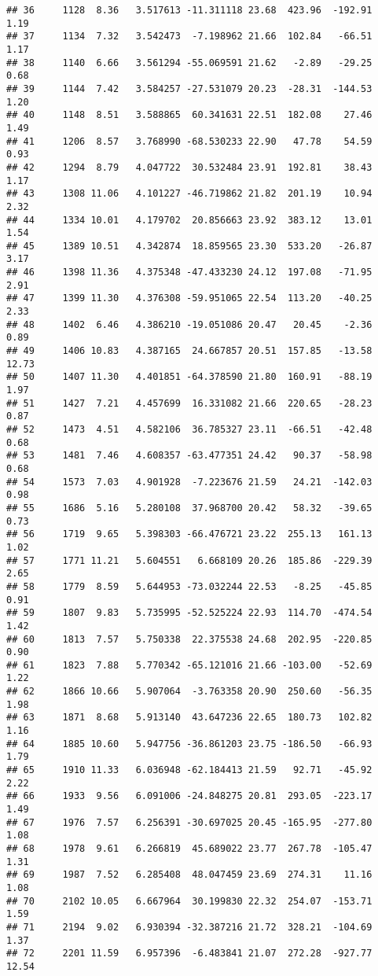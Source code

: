 \documentclass[]{article}
\begin{document}
\begin{verbatim}
## 36     1128  8.36   3.517613 -11.311118 23.68  423.96  -192.91  1.19
## 37     1134  7.32   3.542473  -7.198962 21.66  102.84   -66.51  1.17
## 38     1140  6.66   3.561294 -55.069591 21.62   -2.89   -29.25  0.68
## 39     1144  7.42   3.584257 -27.531079 20.23  -28.31  -144.53  1.20
## 40     1148  8.51   3.588865  60.341631 22.51  182.08    27.46  1.49
## 41     1206  8.57   3.768990 -68.530233 22.90   47.78    54.59  0.93
## 42     1294  8.79   4.047722  30.532484 23.91  192.81    38.43  1.17
## 43     1308 11.06   4.101227 -46.719862 21.82  201.19    10.94  2.32
## 44     1334 10.01   4.179702  20.856663 23.92  383.12    13.01  1.54
## 45     1389 10.51   4.342874  18.859565 23.30  533.20   -26.87  3.17
## 46     1398 11.36   4.375348 -47.433230 24.12  197.08   -71.95  2.91
## 47     1399 11.30   4.376308 -59.951065 22.54  113.20   -40.25  2.33
## 48     1402  6.46   4.386210 -19.051086 20.47   20.45    -2.36  0.89
## 49     1406 10.83   4.387165  24.667857 20.51  157.85   -13.58 12.73
## 50     1407 11.30   4.401851 -64.378590 21.80  160.91   -88.19  1.97
## 51     1427  7.21   4.457699  16.331082 21.66  220.65   -28.23  0.87
## 52     1473  4.51   4.582106  36.785327 23.11  -66.51   -42.48  0.68
## 53     1481  7.46   4.608357 -63.477351 24.42   90.37   -58.98  0.68
## 54     1573  7.03   4.901928  -7.223676 21.59   24.21  -142.03  0.98
## 55     1686  5.16   5.280108  37.968700 20.42   58.32   -39.65  0.73
## 56     1719  9.65   5.398303 -66.476721 23.22  255.13   161.13  1.02
## 57     1771 11.21   5.604551   6.668109 20.26  185.86  -229.39  2.65
## 58     1779  8.59   5.644953 -73.032244 22.53   -8.25   -45.85  0.91
## 59     1807  9.83   5.735995 -52.525224 22.93  114.70  -474.54  1.42
## 60     1813  7.57   5.750338  22.375538 24.68  202.95  -220.85  0.90
## 61     1823  7.88   5.770342 -65.121016 21.66 -103.00   -52.69  1.22
## 62     1866 10.66   5.907064  -3.763358 20.90  250.60   -56.35  1.98
## 63     1871  8.68   5.913140  43.647236 22.65  180.73   102.82  1.16
## 64     1885 10.60   5.947756 -36.861203 23.75 -186.50   -66.93  1.79
## 65     1910 11.33   6.036948 -62.184413 21.59   92.71   -45.92  2.22
## 66     1933  9.56   6.091006 -24.848275 20.81  293.05  -223.17  1.49
## 67     1976  7.57   6.256391 -30.697025 20.45 -165.95  -277.80  1.08
## 68     1978  9.61   6.266819  45.689022 23.77  267.78  -105.47  1.31
## 69     1987  7.52   6.285408  48.047459 23.69  274.31    11.16  1.08
## 70     2102 10.05   6.667964  30.199830 22.32  254.07  -153.71  1.59
## 71     2194  9.02   6.930394 -32.387216 21.72  328.21  -104.69  1.37
## 72     2201 11.59   6.957396  -6.483841 21.07  272.28  -927.77 12.54

\end{verbatim}
\end{document}
